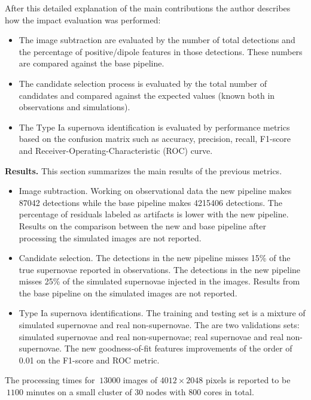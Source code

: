 \documentclass{article}
\begin{document}
After this detailed explanation of the main contributions the author describes how
the impact evaluation was performed:

\begin{itemize}
    \item The image subtraction are evaluated by the number of total detections and
    the percentage of positive/dipole features in those detections. These numbers are
    compared against the base pipeline.
    \item The candidate selection process is evaluated by the total number of
    candidates and compared against the expected values (known both in observations
    and simulations). 
    \item The Type Ia supernova identification is evaluated by performance metrics
    based on the confusion matrix such as accuracy, precision, recall, F1-score and
    Receiver-Operating-Characteristic (ROC) curve.
\end{itemize}

\vspace{1cm}

{\bf Results.} This section summarizes the main results of the previous metrics.
\begin{itemize}
\item Image subtraction. Working on observational data the new pipeline makes 87042
detections while the base pipeline makes 4215406 detections. The percentage of
residuals labeled as artifacts is lower with the new pipeline. Results on the
comparison between the new and base pipeline after processing the simulated images
are not reported.
\item Candidate selection. The detections in the new pipeline misses 15\% of the true
supernovae reported in observations. The detections in the new pipeline misses 25\%
of the simulated supernovae injected in the images. Results from the base pipeline on
the simulated images are not reported.
\item Type Ia supernova identifications. The training and testing set is a mixture of
simulated supernovae and real non-supernovae. The are two validations sets: simulated
supernovae and real non-supernovae; real supernovae and real non-supernovae. The new
goodness-of-fit features improvements of the order of 0.01 on the F1-score and ROC
metric. 
\end{itemize}
The processing times for $~13000$ images of $4012\times 2048$ pixels
is reported to be $~1100$ minutes on a small cluster of 30 nodes with
800 cores in total. 
\end{document}
